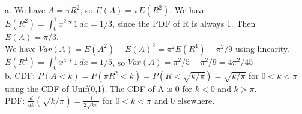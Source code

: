 a. We have \(A = \pi R^{2}\), so \(E(A) = \pi E(R^{2})\). We have \(E(R^{2}) = \int_{0}^{1} x^{2}*1\,dx = 1/3\), since the PDF of R is always 1. Then \(E(A) = \pi/3\). \\

We have \(Var(A) = E(A^{2}) - E(A)^{2} = \pi^{2}E(R^{4}) - \pi^{2}/9\) using linearity. \(E(R^{4}) = \int_{0}^{1} x^{4}*1\,dx = 1/5\), so \(Var(A) = \pi^{2}/5 - \pi^{2}/9 = 4\pi^{2}/45\)\\

b. CDF: \(P(A<k) = P(\pi R^{2} < k) = P(R < \sqrt{k/\pi}) = \sqrt{k/\pi}\) for \(0<k<\pi\) using the CDF of Unif(0,1). The CDF of A is 0 for \(k<0\) and \(k>\pi\).  \\

PDF: \(\frac{d}{dk}(\sqrt{k/\pi}) = \frac{1}{2\sqrt{k\pi}}\) for \(0<k<\pi\) and 0 elsewhere.
